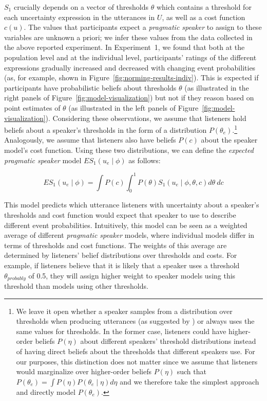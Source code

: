 $S_1$ crucially depends on a vector of thresholds $\theta$ which contains a threshold for each uncertainty expression in the utterances in $U$, 
as well as a cost function $c(u)$. The values that participants expect a \textit{pragmatic speaker} to assign 
to these variables are unknown a priori; we infer these values from the data collected in the above reported experiment. 
In Experiment~1, we found that both at the population level and at the individual level, 
participants' ratings of the different expressions gradually increased and decreased with changing event probabilities 
(as, for example, shown in Figure~\ref{fig:norming-results-indiv}). This is expected if participants
have probabilistic beliefs about thresholds $\theta$ (as illustrated in the right panels of Figure~\ref{fig:model-visualization}) but not if they reason based on point estimates of $\theta$ (as illustrated in the left panels of Figure~\ref{fig:model-visualization}).
Considering these observations,  we assume that listeners hold beliefs about a speaker's thresholds in the form of a distribution $P\left(\theta_e\right)$.\footnote{We leave it open 
whether a {speaker} samples from a distribution over thresholds when producing utterances (as suggested by \cite{Qing2015}) 
or always uses the same values for thresholds. In the former case, listeners could have higher-order beliefs  $P(\eta)$ 
about different {speakers}' threshold distributions instead of having direct beliefs about the thresholds that different 
{speakers} use. For our purposes, this distinction does not matter since we assume that listeners would marginalize over higher-order beliefs $P(\eta)$ such that  $P\left(\theta_e\right) = \int P\left(\eta\right) P\left(\theta_e \mid \eta\right) d\eta$ and we therefore take the simplest approach and directly model $P\left(\theta_e\right)$. } Analogously, we assume that  listeners also have beliefs $P(c)$ about the speaker model's cost function.
Using these two distributions, we can define the \textit{expected pragmatic speaker} model $ES_1\left(u_e \mid \phi \right)$ as follows:

$$ES_1\left(u_e \mid \phi \right) = \int P(c) \int_0^1 P(\theta) S_1\left(u _e\mid \phi, \theta, c\right) d\theta \  d c$$

This model predicts which utterance listeners with uncertainty about a speaker's thresholds and cost function would expect that {speaker} to use to describe different event probabilities. 
Intuitively, this model can be seen as a weighted average of different \textit{pragmatic speaker} models, where individual models differ in terms of thresholds and cost functions.  The weights of this average are determined by listeners' belief distributions over thresholds and costs. For example, if listeners believe that it is likely that a speaker uses a threshold $\theta_{probably}$ of 0.5, they will assign higher weight to speaker models
using this threshold than models using other thresholds. 

